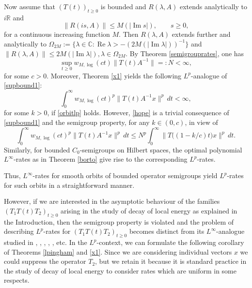 \documentclass[11pt]{amsart}
\theoremstyle{definition}
\theoremstyle{remark}
\numberwithin{equation}{section}
\begin{document}
Now assume that  $(T(t))_{t \ge 0}$ is bounded and  $R(\lambda, A)$ extends analytically to $i\mathbb R$ and
\begin{equation} \label{resbd}
\|R(is,A)\|\le M(|{\operatorname{Im}} s|), \qquad s \ge 0,
\end{equation}
for a continuous increasing function $M$.  Then $R(\lambda, A)$ extends further and analytically to $\Omega_{2M}:=\{\lambda \in \mathbb C: {\operatorname{Re}} \lambda > - (2M(|{\operatorname{Im}} \lambda|))^{-1}\}$ and $\|R(\lambda, A)\| \le 2M(|{\operatorname{Im}}  \lambda |), \lambda \in \Omega_{2M}$.  By Theorem \ref{semigrouprates}, one has
\begin{equation}\label{supbound1}
\sup_{t \ge 0} {w_{M,{\log}}}(ct) \|T(t)A^{-1}\|=:N <\infty,
 \end{equation}
for some $c >0$. Moreover, Theorem \ref{x1} yields the following $L^p$-analogue of  \eqref{supbound1}:
\begin{equation}\label{hope}
\int_{0}^{\infty}w_{M,\log}(ct)^p
\|T(t)A^{-1}x\|^p\,dt <\infty,
\end{equation}
for some $k>0$, if \eqref{orbitlp} holds.
However, \eqref{hope} is a trivial consequence of \eqref{supbound1} and the semigroup property, for any $k \in (0,c)$, in view of
\begin{equation*}
\int_{0}^{\infty} w_{M,\log}(ct)^p
\|T(t)A^{-1}x\|^p\,dt \le N^p   \int_{0}^{\infty} \big\|T\big((1-k/c)t\big)x \big\|^p \, dt.
\end{equation*}
Similarly, for bounded $C_0$-semigroups on Hilbert spaces, the optimal polynomial $L^{\infty}$-rates as in Theorem \ref{borto} give rise to the corresponding $L^p$-rates.

Thus, $L^{\infty}$-rates for smooth orbits of bounded operator semigroups yield  $L^p$-rates for such orbits in a straightforward manner.

However, if we are interested in the asymptotic behaviour of the families $(T_1 T(t) T_2)_{t \ge 0}$ arising in the study of decay of local energy as explained in the Introduction, then the semigroup property is violated and the problem of describing $L^p$-rates for $(T_1 T(t) T_2)_{t \ge 0}$ becomes distinct from its $L^{\infty}$-analogue studied in \cite{BaDu}, \cite{BoTo10}, \cite{Bu98}, \cite{Ch09}, \cite{ChSchVaWu13}, etc.  In the $L^p$-context, we can formulate the following corollary of Theorems \ref{lpingham} and \ref{x1}.   Since we are considering individual vectors $x$ we could suppress the operator $T_2$, but we retain it because it is standard practice in the study of decay of local energy to consider rates which are uniform in some respects.
\end{document}
